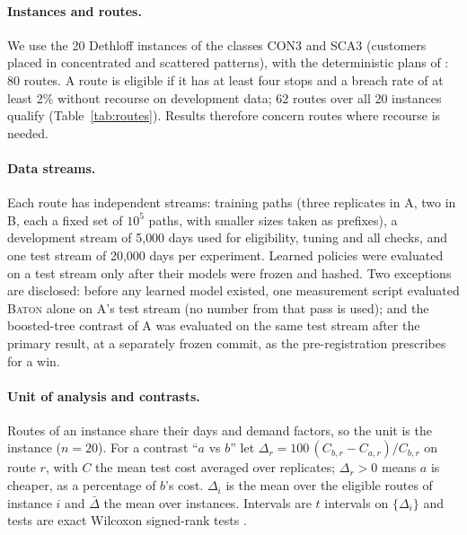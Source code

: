 \documentclass[trsc,dblanonrev]{informs4}
\newcommand{\Baton}{\textsc{Baton}}
\begin{document}
\paragraph{Instances and routes.} We use the 20 Dethloff instances
\citep{dethloff2001vehicle} of the classes CON3 and SCA3 (customers placed
in concentrated and scattered patterns), with the deterministic plans of
\citet{dang2026baton}: 80 routes. A route is eligible if it has at least four
stops and a breach rate of at least 2\% without recourse on development data;
62 routes over all 20 instances qualify (Table~\ref{tab:routes}). Results
therefore concern routes where recourse is needed.

\begin{table}[t]
{}{}
\end{table}

\paragraph{Data streams.} Each route has independent streams: training paths
(three replicates in A, two in B, each a fixed set of $10^5$ paths, with
smaller sizes taken as prefixes), a development stream of 5{,}000 days used for
eligibility, tuning and all checks, and one test stream of 20{,}000 days per
experiment. Learned policies were evaluated on a test stream only after their
models were frozen and hashed. Two exceptions are disclosed: before any
learned model existed, one measurement script evaluated \Baton{} alone on A's
test stream (no number from that pass is used); and the boosted-tree contrast
of A was evaluated on the same test stream after the primary result, at a
separately frozen commit, as the pre-registration prescribes for a win.

\paragraph{Unit of analysis and contrasts.} Routes of an instance share their
days and demand factors, so the unit is the instance ($n = 20$). For a contrast
``$a$ vs $b$'' let $\Delta_r = 100\,(C_{b,r} - C_{a,r})/C_{b,r}$ on route $r$,
with $C$ the mean test cost averaged over replicates; $\Delta_r > 0$ means $a$
is cheaper, as a percentage of $b$'s cost. $\Delta_i$ is the mean over the
eligible routes of instance $i$ and $\bar\Delta$ the mean over instances.
Intervals are $t$ intervals on $\{\Delta_i\}$ and tests are exact Wilcoxon
signed-rank tests \citep{wilcoxon1945individual}.
\end{document}
